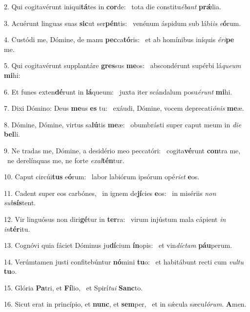 2. Qui cogitavérunt iniqui\textbf{tá}tes in \textbf{cor}de: \ast\  tota die constitu\textit{é}\textit{bant} \textbf{prǽ}lia.\

3. Acuérunt linguas suas \textbf{sic}ut ser\textbf{pén}tis: \ast\  venénum áspidum sub lábi\textit{is} \textit{e}\textbf{ó}rum.\

4. Custódi me, Dómine, de manu \textbf{pec}ca\textbf{tó}ris: \ast\  et ab homínibus iníquis \textit{é}\textit{ri}\textbf{pe} me.\

5. Qui cogitavérunt supplantáre \textbf{gres}sus \textbf{me}os: \ast\  abscondérunt supérbi lá\textit{que}\textit{um} \textbf{mi}hi:\

6. Et funes exten\textbf{dé}runt in \textbf{lá}queum: \ast\  juxta iter scándalum posu\textit{é}\textit{runt} \textbf{mi}hi.\

7. Dixi Dómino: Deus \textbf{me}us \textbf{es} tu: \ast\  exáudi, Dómine, vocem deprecati\textit{ó}\textit{nis} \textbf{me}æ.\

8. Dómine, Dómine, virtus sa\textbf{lú}tis \textbf{me}æ: \ast\  obumbrásti super caput meum in \textit{di}\textit{e} \textbf{bel}li.\

9. Ne tradas me, Dómine, a desidério meo peccatóri: \dag\  cogita\textbf{vé}runt \textbf{con}tra me, \ast\  ne derelínquas me, ne forte \textit{ex}\textit{al}\textbf{tén}tur.\

10. Caput circúi\textbf{tus} e\textbf{ó}rum: \ast\  labor labiórum ipsórum opé\textit{ri}\textit{et} \textbf{e}os.\

11. Cadent super eos carbónes, \dag\  in ignem de\textbf{jí}cies \textbf{e}os: \ast\  in misériis \textit{non} \textit{sub}\textbf{sís}tent.\

12. Vir linguósus non diri\textbf{gé}tur in \textbf{ter}ra: \ast\  virum injústum mala cápient \textit{in} \textit{in}\textbf{tér}itu.\

13. Cognóvi quia fáciet Dóminus ju\textbf{dí}cium \textbf{ín}opis: \ast\  et vin\textit{díc}\textit{tam} \textbf{páu}perum.\

14. Verúmtamen justi confitebúntur \textbf{nó}mini \textbf{tu}o: \ast\  et habitábunt recti cum \textit{vul}\textit{tu} \textbf{tu}o.\

15. Glória \textbf{Pa}tri, et \textbf{Fí}lio, \ast\  et Spirí\textit{tu}\textit{i} \textbf{Sanc}to.\

16. Sicut erat in princípio, et \textbf{nunc}, et \textbf{sem}per, \ast\  et in sǽcula sæcu\textit{ló}\textit{rum}. \textbf{A}men.\


